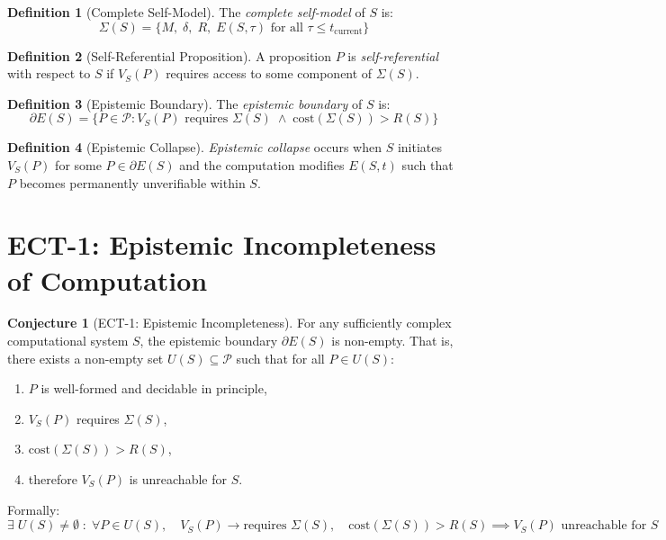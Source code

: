 \documentclass[12pt]{article}
\theoremstyle{definition}
\newtheorem{definition}{Definition}[section]
\newtheorem{conjecture}{Conjecture}[section]
\newcommand{\ES}{E(S, t)}
\newcommand{\SM}{\Sigma(S)}
\newcommand{\EB}{\partial E(S)}
\newcommand{\VS}{V_S}
\newcommand{\RS}{R(S)}
\newcommand{\US}{U(S)}
\begin{document}
\begin{definition}[Complete Self-Model]
The \emph{complete self-model} of $S$ is:
\[
  \SM = \bigl\{ M,\; \delta,\; R,\; E(S, \tau) \text{ for all } \tau \leq t_{\mathrm{current}} \bigr\}
\]
\end{definition}

\begin{definition}[Self-Referential Proposition]
A proposition $P$ is \emph{self-referential} with respect to $S$ if $\VS(P)$ requires access to some component of $\SM$.
\end{definition}

\begin{definition}[Epistemic Boundary]
The \emph{epistemic boundary} of $S$ is:
\[
  \EB = \bigl\{ P \in \mathcal{P} : \VS(P) \text{ requires } \SM \;\wedge\; \mathrm{cost}(\SM) > \RS \bigr\}
\]
\end{definition}

\begin{definition}[Epistemic Collapse]
\emph{Epistemic collapse} occurs when $S$ initiates $\VS(P)$ for some $P \in \EB$ and the computation modifies $\ES$ such that $P$ becomes permanently unverifiable within $S$.
\end{definition}

\section{ECT-1: Epistemic Incompleteness of Computation}
\label{sec:ect1}

\begin{conjecture}[ECT-1: Epistemic Incompleteness]
\label{conj:ect1}
For any sufficiently complex computational system $S$, the epistemic boundary $\EB$ is non-empty. That is, there exists a non-empty set $\US \subseteq \mathcal{P}$ such that for all $P \in \US$:
\begin{enumerate}[label=(\roman*)]
  \item $P$ is well-formed and decidable in principle,
  \item $\VS(P)$ requires $\SM$,
  \item $\mathrm{cost}(\SM) > \RS$,
  \item therefore $\VS(P)$ is unreachable for $S$.
\end{enumerate}
\end{conjecture}

Formally:
\[
  \exists\; \US \neq \emptyset \;:\; \forall P \in \US,\quad
  \VS(P) \to \text{requires } \SM,\quad
  \mathrm{cost}(\SM) > \RS
  \implies \VS(P) \text{ unreachable for } S
\]
\end{document}
